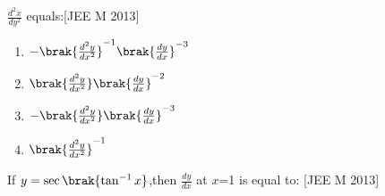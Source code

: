     \item $\frac{d^2x}{dy^2}$ equals:\hfill[JEE M 2013]
    \begin{multicols}{2}
        
    
	    \begin{enumerate}
		    \item  $-\brak{{\frac{d^2y}{dx^2}}}^{-1}\brak{{\frac{dy}{dx}}}^{-3}$
		    \item $\brak{{\frac{d^2y}{dx^2}}}\brak{{\frac{dy}{dx}}}^{-2}$

		    \item $-\brak{{\frac{d^2y}{dx^2}}}\brak{{\frac{dy}{dx}}}^{-3}$
		    \item $\brak{\frac{d^2y}{dx^2}}^{-1}$
	    \end{enumerate}
     \end{multicols}
    \item If $y=\sec\brak{\tan^{-1}x}$,then $\frac{dy}{dx}$ at $x$=1 is equal to:
    \hfill[JEE M 2013]


